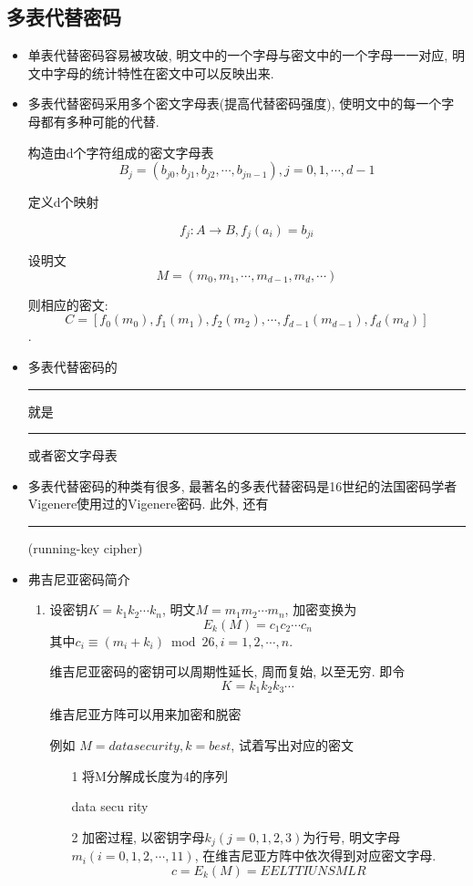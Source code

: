 \documentclass[UTF8]{ctexart}
\newcommand\hl{\bgroup\markoverwith
  {\textcolor{yellow}{\rule[-.5ex]{2pt}{2.5ex}}}\ULon}
\begin{document}
    \subsection{多表代替密码}
    \begin{itemize}
        \item 单表代替密码容易被攻破, 明文中的一个字母与密文中的一个字母一一对应, 明文中字母的统计特性在密文中可以反映出来.
        \item 多表代替密码采用多个密文字母表(提高代替密码强度), 使明文中的每一个字母都有多种可能的代替.

        构造由d个字符组成的密文字母表
        $$B_j=(b_{j0}, b_{j1}, b_{j2}, \cdots, b_{jn-1}), j=0,1, \cdots, d-1$$

        定义d个映射

        $$f_j: A\rightarrow B, f_j(a_i)=b_{ji}$$

        设明文
        $$M=(m_0, m_1, \cdots, m_{d-1}, m_d, \cdots)$$

        则相应的密文:
        $$C=[f_0(m_0), f_1(m_1), f_2(m_2), \cdots, f_{d-1}(m_{d-1}), f_d(m_d)]$$.

        \item 多表代替密码的\hl{密钥}就是\hl{d个映射}或者密文字母表
        \item 多表代替密码的种类有很多, 最著名的多表代替密码是16世纪的法国密码学者Vigenere使用过的Vigenere密码.
        此外, 还有\hl{游动钥密码}(running-key cipher)

        \item 弗吉尼亚密码简介
        \begin{enumerate}
            \item 设密钥$K=k_1k_2\cdots k_n$, 明文$M=m_1m_2\cdots m_n$, 加密变换为
            $$E_k(M)=c_1c_2\cdots c_n$$
            其中$c_i\equiv (m_i+k_i)\bmod26, i=1, 2,\cdots, n$.

            维吉尼亚密码的密钥可以周期性延长, 周而复始, 以至无穷. 即令
            $$K=k_1k_2k_3\cdots$$

            维吉尼亚方阵可以用来加密和脱密

            例如 $M=data security, k=best$, 试着写出对应的密文
            \begin{itemize}
                \item [1] 将M分解成长度为4的序列

                data secu rity

                \item [2] 加密过程, 以密钥字母$k_j(j=0, 1, 2, 3)$为行号, 明文字母$m_i(i=0, 1, 2, \cdots, 11)$, 在维吉尼亚方阵中依次得到对应密文字母.
                $$c=E_k(M)=EELT TIUN SMLR$$


\end{itemize}
\end{enumerate}
\end{itemize}
\end{document}
